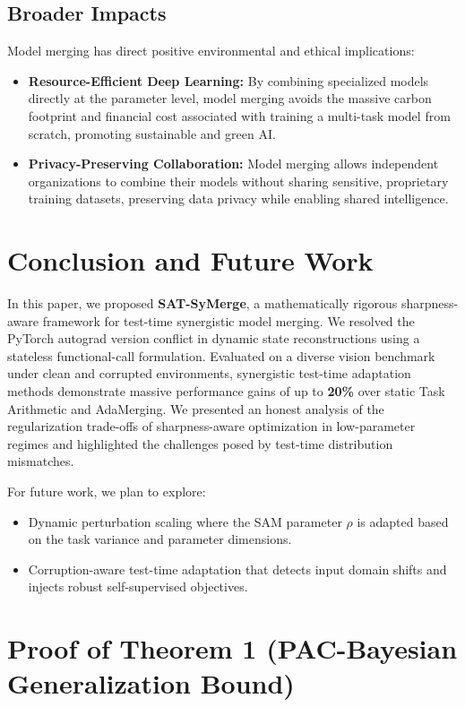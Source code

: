 \documentclass{article}
\begin{document}
\subsection{Broader Impacts}
Model merging has direct positive environmental and ethical implications:
\begin{itemize}
    \item \textbf{Resource-Efficient Deep Learning:} By combining specialized models directly at the parameter level, model merging avoids the massive carbon footprint and financial cost associated with training a multi-task model from scratch, promoting sustainable and green AI.
    \item \textbf{Privacy-Preserving Collaboration:} Model merging allows independent organizations to combine their models without sharing sensitive, proprietary training datasets, preserving data privacy while enabling shared intelligence.
\end{itemize}

\section{Conclusion and Future Work}
\label{sec:conclusion}

In this paper, we proposed \textbf{SAT-SyMerge}, a mathematically rigorous sharpness-aware framework for test-time synergistic model merging. We resolved the PyTorch autograd version conflict in dynamic state reconstructions using a stateless functional-call formulation. Evaluated on a diverse vision benchmark under clean and corrupted environments, synergistic test-time adaptation methods demonstrate massive performance gains of up to \textbf{20\%} over static Task Arithmetic and AdaMerging. We presented an honest analysis of the regularization trade-offs of sharpness-aware optimization in low-parameter regimes and highlighted the challenges posed by test-time distribution mismatches. 

For future work, we plan to explore:
\begin{itemize}
    \item Dynamic perturbation scaling where the SAM parameter $\rho$ is adapted based on the task variance and parameter dimensions.
    \item Corruption-aware test-time adaptation that detects input domain shifts and injects robust self-supervised objectives.
\end{itemize}

\clearpage
\appendix
\section{Proof of Theorem 1 (PAC-Bayesian Generalization Bound)}
\label{sec:proof}
\end{document}

